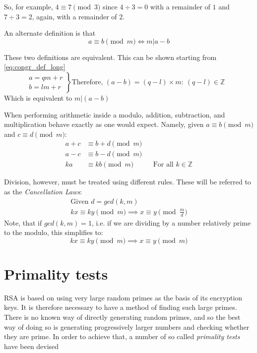 \documentclass[12pt, titlepage]{article}
\begin{document}
    So, for example, $4 \equiv 7 \pmod{3}$ since $4 \div 3 = 0$ with a remainder of $1$ and
    $7 \div 3 = 2$, again, with a remainder of $2$.

    An alternate definition is that
    \begin{equation*}
        a \equiv b \pmod{m} \iff m | a-b
    \end{equation*}

    These two definitions are equivalent. This can be shown starting from
    \eqref{eq:congr_def_long}
%
    \begin{equation*}
        \left. 
            \begin{aligned}
                a = qm + r\\ 
                b = lm + r
            \end{aligned}
        \right\}
        \text{Therefore, } (a - b) = (q-l)\times m :\: (q-l) \in \mathbb{Z}\quad
    \end{equation*}
    Which is equivalent to $m | (a-b)$

    When performing arithmetic inside a modulo, addition, subtraction, and multiplication
    behave exactly as one would expect. Namely, given
    $a\equiv b\pmod{m}$ and $c\equiv d\pmod{m}$:
    \begin{align*}
        a + c &\equiv b + d \pmod{m}\\
        a - c &\equiv b - d \pmod{m}\\
        ka 	  &\equiv kb \pmod{m} &&\text{For all } k \in \mathbb{Z}
    \end{align*}

    Division, however, must be treated using different rules. These will be referred to as
    the \emph{Cancellation Laws}\autocite[280]{haese_ib_options}:
    \begin{gather*}
        \text{Given } d = gcd(k, m)\\
        kx \equiv ky \pmod{m} \implies x \equiv y \pmod{\frac{m}{d}}
    \end{gather*}
    Note, that if $gcd(k, m) = 1$, i.e. if we are dividing by a number relatively prime to
    the modulo, this simplifies to:
    \begin{equation*}
        kx \equiv ky \pmod{m} \implies x \equiv y \pmod{m}
    \end{equation*}


\section{Primality tests}
RSA is based on using very large random primes as the basis of its encryption keys. It is
therefore necessary to have a method of finding such large primes. There is no known way of
directly generating random primes, and so the best way of doing so is generating
progressively larger numbers and checking whether they are prime. In order to achieve that,
a number of so called \emph{primality tests} have been devised
\end{document}
